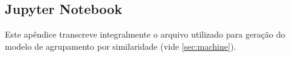 	\begin{apendicesenv}
	
	\partapendices
	
	\chapter{Jupyter Notebook} \label{ap:jupyter}
	
	Este apêndice transcreve integralmente o arquivo utilizado para geração do modelo de agrupamento por similaridade (vide \autoref{sec:machine}).
	
	
	
	
	
	\end{apendicesenv}
	
	
	
	
	
